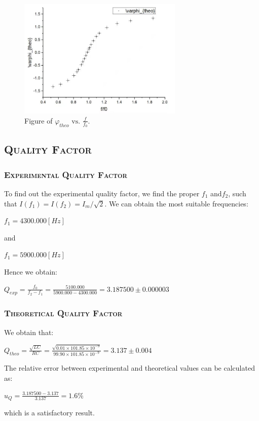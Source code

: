 \documentclass[a4paper,12pt]{article}
\begin{document}
\newpage
\begin{figure}[htb] 
    \centering
    \includegraphics[width=0.7\textwidth]{o3} 
    \caption{Figure of $\varphi_{theo} \text { vs. } \frac{f}{f_{0}}$.} 
\end{figure}

\subsection{\textsc{Quality Factor}}
\subsubsection{\textsc{Experimental Quality Factor}}
To find out the experimental quality factor, we find the proper $f_1$ and$f_2$, such that $I(f_1) = I(f_2) = I_m/\sqrt{2}$. We can obtain the most suitable frequencies:
\begin{center}
$ f_1 = 4300.000 [Hz] $
\end{center}
and 
\begin{center}
$ f_1 = 5900.000 [Hz] $
\end{center}
Hence we obtain:
\begin{center}
$\displaystyle Q_{exp} = \frac{f_0}{f_2 - f_1} = \frac{5100.000}{5900.000 - 4300.000} = 3.187500 \pm 0.000003$
\end{center}
\subsubsection{\textsc{Theoretical Quality Factor}}
We obtain that:
\begin{center}
$\displaystyle Q_{theo} = \frac{\sqrt{LC}}{RC} = \frac{\sqrt{0.01 \times 101.85\times 10^{-9} }}{99.90 \times 101.85\times 10^{-9}} = 3.137 \pm 0.004$
\end{center}
\par The relative error between experimental and theoretical values can be calculated as:
\begin{center}
$\displaystyle u_Q =  \frac{3.187500 - 3.137}{3.137} = 1.6\% $
\end{center}
which is a satisfactory result.
\end{document}
